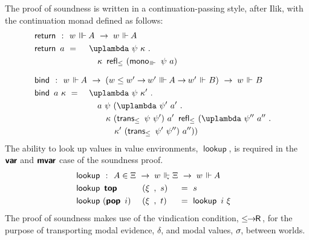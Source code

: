 \documentclass[submission,copyright,creativecommons,sharealike,backref=page]{eptcs}
\newcommand{\sA}{\mkern-2muA}
\newcommand{\R}{\mathrel{\rlap{$\mkern.75mu\textsf{R}$}\hphantom{\subseteq}}}
\renewcommand{\:}{\mathop{\mkern3mu:\mkern3mu}}
\renewcommand{\.}{\mathop{\mkern3mu.\mkern3mu}}
\renewcommand{\;}{\mathop{;}}
\renewcommand{\,}{\mathop{,}}
\newcommand{\ee}{\mathrel{\mkern2mu\Vdash\mkern1mu}}
\newcommand{\ees}{\mathrel{\mkern2mu\Vdash_{\mkern-9mu\scriptscriptstyle{\star}}}}
\newcommand{\eee}{\mathrel{\mkern2mu\Vvdash\mkern1mu}}
\renewcommand{\r}{\mathrel{\rightarrow\mkern-1mu}}
\newcommand{\monoeee}{\operatorname{\textsf{mono}_{\eee}}}
\newcommand{\reflle}{\operatorname{\textsf{refl}_{\le}}}
\newcommand{\transle}{\operatorname{\textsf{trans}_{\le}}}
\newcommand{\lerR}{\operatorname{\le\mkern-1mu\r\mkern-1mu\R}}
\newcommand{\var}{\operatorname{\textsf{\textbf{var}}}}
\newcommand{\mvar}{\operatorname{\textsf{\textbf{mvar}}}}
\newcommand{\tops}{\operatorname{\textsf{\textbf{top}}}}
\newcommand{\pops}{\operatorname{\textsf{\textbf{pop}}}}
\newcommand{\return}{\operatorname{\textsf{return}}}
\newcommand{\bind}{\operatorname{\textsf{bind}}}
\newcommand{\lookup}{\operatorname{\textsf{lookup}}}
\theoremstyle{mystyle}
\begin{document}
The proof of soundness is written in a continuation-passing style, after Ilik, with the continuation monad defined as follows:
\begin{alignat*}{3}
  & \return ~\:~ \rlap{$w \eee \sA ~\r~ w \ee \sA$}\\
  & \return~a      ~=~ && \uplambda~\psi~\kappa \.\\
  &                    && \quad \kappa~\reflle~(\monoeee~\psi~a)\\[.5\baselineskip]
  & \bind ~\:~ \rlap{$w \ee \sA ~\r~ (w \le w' \r w' \eee \sA \r w' \ee B) ~\r~ w \ee B$}\\
  & \bind~a~\kappa ~=~ && \uplambda~\psi~\kappa' \.\\
  &                    && \quad a~\psi~(\uplambda~\psi'~a' \.\\
  &                    && \quad\quad \kappa~(\transle~\psi~\psi')~a'~\reflle~(\uplambda~\psi''~a'' \.\\
  &                    && \quad\quad\quad \kappa'~(\transle~\psi'~\psi'')~a''))
\end{alignat*}
The ability to look up values in value environments, $\lookup$, is required in the $\var$ and $\mvar$ case of the soundness proof.
\begin{alignat*}{3}
  & \lookup ~\:~ \rlap{$A \in \Xi ~\r~ w \ees \Xi ~\r~ w \ee \sA$}\\
  & \lookup~\tops     && ~(\xi~\,~s) && ~=~ s\\
  & \lookup~(\pops~i) && ~(\xi~\,~t) && ~=~ \lookup~i~\xi
\end{alignat*}
The proof of soundness makes use of the vindication condition, $\lerR$, for the purpose of transporting modal evidence, $\delta$, and modal values, $\sigma\mkern-2mu$, between worlds.
\end{document}
